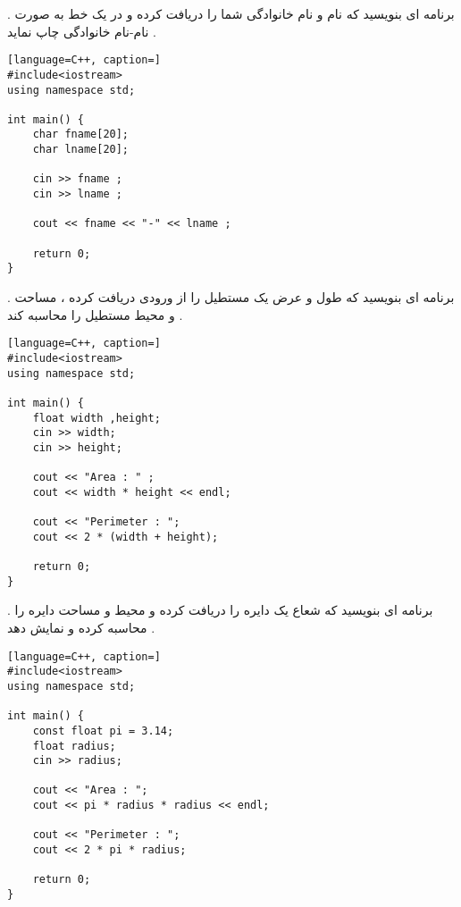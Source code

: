 \documentclass[12pt]{article}
\begin{document}
\newpage

 . برنامه ای بنویسید که نام و نام خانوادگی شما را دریافت کرده و در یک خط به صورت نام-نام خانوادگی چاپ نماید .



\begin{latin}
\begin{lstlisting}[language=C++, caption=]
#include<iostream>
using namespace std;

int main() {
	char fname[20];
	char lname[20];
	
	cin >> fname ;
	cin >> lname ;
	
	cout << fname << "-" << lname ;
	
	return 0;
}
\end{lstlisting}
\end{latin}



 . برنامه ای بنویسید که طول و عرض یک مستطیل را از ورودی دریافت کرده ، مساحت و محیط مستطیل را محاسبه کند .


\begin{latin}
\begin{lstlisting}[language=C++, caption=]
#include<iostream>
using namespace std;

int main() {
	float width ,height;
	cin >> width;
	cin >> height;
	
	cout << "Area : " ;
	cout << width * height << endl;
		
	cout << "Perimeter : ";
	cout << 2 * (width + height);
	
	return 0;
}
\end{lstlisting}
\end{latin}



 . برنامه ای بنویسید که شعاع یک دایره را دریافت کرده و محیط و مساحت دایره را محاسبه کرده و نمایش دهد .


\begin{latin}
\begin{lstlisting}[language=C++, caption=]
#include<iostream>
using namespace std;

int main() {
	const float pi = 3.14;
	float radius;
	cin >> radius;
	
	cout << "Area : ";
	cout << pi * radius * radius << endl;
	
	cout << "Perimeter : ";
	cout << 2 * pi * radius;
	
	return 0;
}
\end{lstlisting}
\end{latin}
\end{document}
